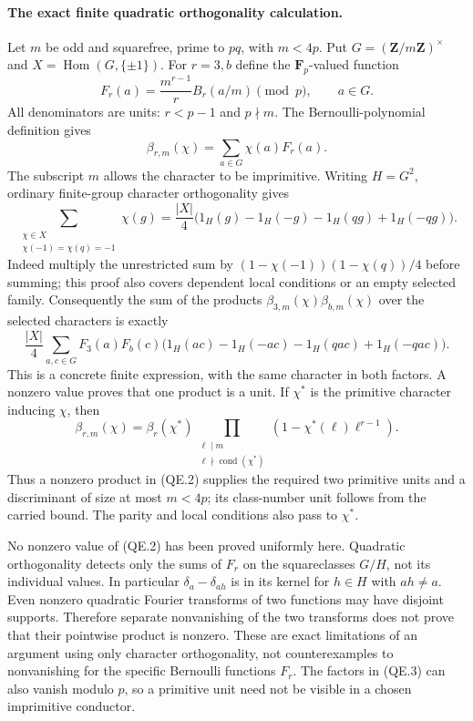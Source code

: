 \paragraph{The exact finite quadratic orthogonality calculation.}
Let $m$ be odd and squarefree, prime to $pq$, with $m<4p$.
Put $G=(\mathbf Z/m\mathbf Z)^\times$ and
$X=\operatorname{Hom}(G,\{\pm1\})$.  For $r=3,b$ define the
$\mathbf F_p$-valued function
\[
 F_r(a)=\frac{m^{r-1}}r B_r(a/m)\pmod p,\qquad a\in G.
\]
All denominators are units: $r<p-1$ and $p\nmid m$.
The Bernoulli-polynomial definition gives
\[
 \beta_{r,m}(\chi)=\sum_{a\in G}\chi(a)F_r(a).
\]
The subscript $m$ allows the character to be imprimitive.
Writing $H=G^2$, ordinary finite-group character orthogonality gives
\[
 \sum_{\substack{\chi\in X\\\chi(-1)=\chi(q)=-1}}\chi(g)
 =\frac{|X|}{4}
  \bigl(1_H(g)-1_H(-g)-1_H(qg)+1_H(-qg)\bigr).
 \tag{QE.1}
\]
Indeed multiply the unrestricted sum by
$(1-\chi(-1))(1-\chi(q))/4$ before summing; this proof also
covers dependent local conditions or an empty selected family.
Consequently the sum of the products
$\beta_{3,m}(\chi)\beta_{b,m}(\chi)$ over the selected characters
is exactly
\[
 \frac{|X|}{4}\sum_{a,c\in G}F_3(a)F_b(c)
  \bigl(1_H(ac)-1_H(-ac)-1_H(qac)+1_H(-qac)\bigr).
 \tag{QE.2}
\]
This is a concrete finite expression, with the same character in
both factors.  A nonzero value proves that one product is a unit.
If $\chi^*$ is the primitive character inducing $\chi$, then
\[
 \beta_{r,m}(\chi)=\beta_r(\chi^*)
  \prod_{\substack{\ell\mid m\\\ell\nmid\operatorname{cond}(\chi^*)}}
       (1-\chi^*(\ell)\ell^{r-1}).
 \tag{QE.3}
\]
Thus a nonzero product in (QE.2) supplies the required two primitive
units and a discriminant of size at most $m<4p$; its class-number
unit follows from the carried bound.  The parity and local
conditions also pass to $\chi^*$.

No nonzero value of (QE.2) has been proved uniformly here.
Quadratic orthogonality detects only the sums of $F_r$ on the
squareclasses $G/H$, not its individual values.  In particular
$\delta_a-\delta_{ah}$ is in its kernel for $h\in H$ with
$ah\ne a$.  Even nonzero quadratic Fourier transforms of two
functions may have disjoint supports.  Therefore separate
nonvanishing of the two transforms does not prove that their
pointwise product is nonzero.  These are exact limitations of an
argument using only character orthogonality, not counterexamples
to nonvanishing for the specific Bernoulli functions $F_r$.
The factors in (QE.3) can also vanish modulo $p$, so a primitive
unit need not be visible in a chosen imprimitive conductor.

